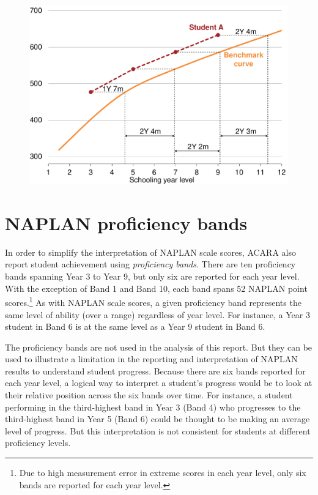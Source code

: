 \begin{figure}[t]
 \includegraphics[width=\columnwidth]{atlas/Benchmark_curve.pdf}\label{fig:benchmark}

\end{figure}

\section{NAPLAN proficiency bands} \label{sec:bands}

In order to simplify the interpretation of NAPLAN scale scores, ACARA also report student achievement using \textit{proficiency bands}. There are ten proficiency bands spanning Year 3 to Year 9, but only six are reported for each year level. With the exception of Band 1 and Band 10, each band spans 52 NAPLAN point scores.\footnote{Due to high measurement error in extreme scores in each year level, only six bands are reported for each year level.} As with NAPLAN scale scores, a given proficiency band represents the same level of ability (over a range) regardless of year level. For instance, a Year 3 student in Band 6 is at the same level as a Year 9 student in Band 6.

The proficiency bands are not used in the analysis of this report. But they can be used to illustrate a limitation in the reporting and interpretation of NAPLAN results to understand student progress. Because there are six bands reported for each year level, a logical way to interpret a student's progress would be to look at their relative position across the six bands over time. For instance, a student performing in the third-highest band in Year 3 (Band 4) who progresses to the third-highest band in Year 5 (Band 6) could be thought to be making an average level of progress. But this interpretation is not consistent for students at different proficiency levels.

